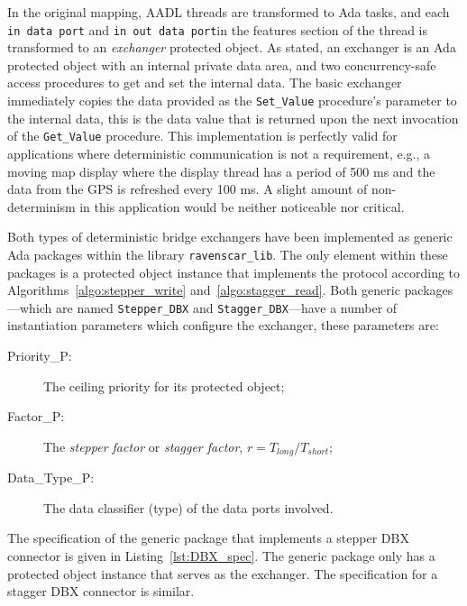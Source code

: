 In the original mapping, AADL threads are transformed to Ada tasks,
and each \texttt{in data port} and \texttt{in out data port}in the
features section of the thread is transformed to an \emph{exchanger}
protected object. As stated, an exchanger is an Ada protected object
with an internal private data area, and two concurrency-safe access
procedures to get and set the internal data. The basic exchanger
immediately copies the data provided as the \texttt{Set\_Value}
procedure's parameter to the internal data, this is the data value
that is returned upon the next invocation of the \texttt{Get\_Value}
procedure. This implementation is perfectly valid for applications
where deterministic communication is not a requirement, e.g., a moving
map display where the display thread has a period of 500 ms and the
data from the GPS is refreshed every 100 ms. A slight amount of
non-determinism in this application would be neither noticeable nor
critical.

Both types of deterministic bridge exchangers have been implemented as
generic Ada packages within the library \texttt{ravenscar\_lib}. The
only element within these packages is a protected object instance that
implements the protocol according to
Algorithms~\ref{algo:stepper_write} and~\ref{algo:stagger_read}. Both
generic packages---which are named \texttt{Stepper\_DBX} and
\texttt{Stagger\_DBX}---have a number of instantiation parameters
which configure the exchanger, these parameters are:

\begin{description}
\item[Priority\_P:]{The ceiling priority for its protected object;}
\item[Factor\_P:]{The \emph{stepper factor} or \emph{stagger factor},
  $r=T_{long}/T_{short}$;}
\item[Data\_Type\_P:]{The data classifier (type) of the data ports
  involved.} 
\end{description}

The specification of the generic package that implements a stepper DBX
connector is given in Listing~\ref{lst:DBX_spec}. The generic package
only has a protected object instance that serves as the exchanger. The
specification for a stagger DBX connector is similar.

